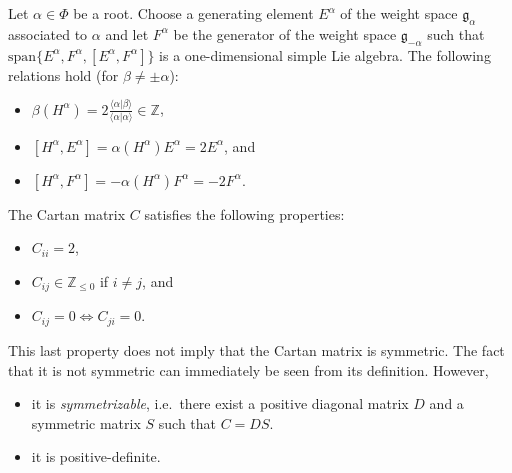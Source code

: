     \begin{property}
        Let $\alpha\in\Phi$ be a root. Choose a generating element $E^\alpha$ of the weight space $\mathfrak{g}_\alpha$ associated to $\alpha$ and let $F^\alpha$ be the generator of the weight space $\mathfrak{g}_{-\alpha}$ such that $\mathrm{span}\{E^\alpha,F^\alpha,[E^\alpha,F^\alpha]\}$ is a one-dimensional simple Lie algebra. The following relations hold (for $\beta\neq\pm\alpha$):
        \begin{itemize}
            \item $\beta(H^\alpha) = 2\frac{\langle\alpha|\beta\rangle}{\langle\alpha|\alpha\rangle}\in\mathbb{Z}$,
            \item $[H^\alpha,E^\alpha] = \alpha(H^\alpha)E^\alpha = 2E^\alpha$, and
            \item $[H^\alpha,F^\alpha] = -\alpha(H^\alpha)F^\alpha = -2F^\alpha$.
        \end{itemize}
    \end{property}

    \begin{property}\label{lie:cartan_prop}
        The Cartan matrix $C$ satisfies the following properties:
        \begin{itemize}
            \item $C_{ii}=2$,
            \item $C_{ij}\in\mathbb{Z}_{\leq0}$ if $i\neq j$, and
            \item $C_{ij}=0\iff C_{ji}=0$.
        \end{itemize}
        This last property does not imply that the Cartan matrix is symmetric. The fact that it is not symmetric can immediately be seen from its definition. However,
        \begin{itemize}
            \item it is \textit{symmetrizable}, i.e.~there exist a positive diagonal matrix $D$ and a symmetric matrix $S$ such that $C=DS$.
            \item it is positive-definite.
        \end{itemize}
    \end{property}

